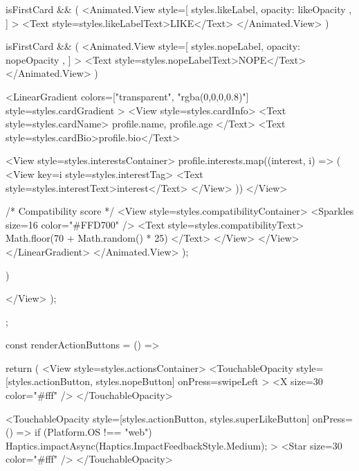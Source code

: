 {{{{                {isFirstCard && (
                  <Animated.View
                    style={[
                      styles.likeLabel,
                      { opacity: likeOpacity },
                    ]}
                  >
                    <Text style={styles.likeLabelText}>LIKE</Text>
                  </Animated.View>
                )}
                
                {isFirstCard && (
                  <Animated.View
                    style={[
                      styles.nopeLabel,
                      { opacity: nopeOpacity },
                    ]}
                  >
                    <Text style={styles.nopeLabelText}>NOPE</Text>
                  </Animated.View>
                )}
                
                <LinearGradient
                  colors={["transparent", "rgba(0,0,0,0.8)"]}
                  style={styles.cardGradient}
                >
                  <View style={styles.cardInfo}>
                    <Text style={styles.cardName}>
                      {profile.name}, {profile.age}
                    </Text>
                    <Text style={styles.cardBio}>{profile.bio}</Text>
                    
                    <View style={styles.interestsContainer}>
                      {profile.interests.map((interest, i) => (
                        <View key={i} style={styles.interestTag}>
                          <Text style={styles.interestText}>{interest}</Text>
                        </View>
                      ))}
                    </View>

                    {/* Compatibility score */}
                    <View style={styles.compatibilityContainer}>
                      <Sparkles size={16} color="#FFD700" />
                      <Text style={styles.compatibilityText}>
                        {Math.floor(70 + Math.random() * 25)}%
                      </Text>
                    </View>
                  </View>
                </LinearGradient>
              </Animated.View>
            );
          })}
      </View>
    );
  };
  
  const renderActionButtons = () => {
    return (
      <View style={styles.actionsContainer}>
        <TouchableOpacity
          style={[styles.actionButton, styles.nopeButton]}
          onPress={swipeLeft}
        >
          <X size={30} color="#fff" />
        </TouchableOpacity>
        
        <TouchableOpacity
          style={[styles.actionButton, styles.superLikeButton]}
          onPress={() => {
            if (Platform.OS !== "web") {
              Haptics.impactAsync(Haptics.ImpactFeedbackStyle.Medium);
            }
          }}
        >
          <Star size={30} color="#fff" />
        </TouchableOpacity>
        
}}
